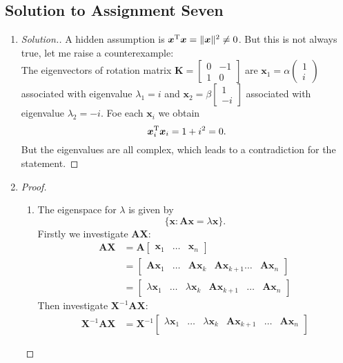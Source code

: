 \subsection{Solution to Assignment Seven}
\begin{enumerate}
\item
\begin{proof}[Solution.]
A hidden assumption is $\bm x^{\mathrm T}\bm x=\|\bm x\|^2\ne0$. But this is not always true, let me raise a counterexample:\\
The eigenvectors of rotation matrix $\bm K=\begin{bmatrix}
0&-1\\1&0
\end{bmatrix}$ are $\bm x_1=\alpha\begin{pmatrix}
1\\i
\end{pmatrix}$ associated with eigenvalue $\lambda_1=i$ and $\bm x_2=\beta\begin{bmatrix}
1\\-i
\end{bmatrix}$ associated with eigenvalue $\lambda_2=-i$. Foe each $\bm x_i$ we obtain
\[
\bm x_i^{\mathrm T}\bm x_i=1+i^2=0.
\]
But the eigenvalues are all complex, which leads to a contradiction for the statement.
\end{proof}
\item
\begin{proof}
\begin{enumerate}
\item
The eigenspace for $\lambda$ is given by
\[
\{\bm x:\bm A\bm x=\lambda\bm x\}.
\]
Firstly we investigate $\bm{AX}$:
\begin{align*}
\bm A\bm X&=\bm A\begin{bmatrix}
\bm x_1&\dots&\bm x_n
\end{bmatrix}\\
&=\begin{bmatrix}
\bm A\bm x_1&\dots&\bm A\bm x_k&\bm A\bm x_{k+1}\dots&\bm A\bm x_n
\end{bmatrix}\\
&=
\begin{bmatrix}
\lambda\bm x_1&\dots&\lambda\bm x_k&\bm A\bm x_{k+1}&\dots&\bm A\bm x_n
\end{bmatrix}
\end{align*}
Then investigate $\bm X^{-1}\bm A\bm X:$
\begin{align*}
\bm X^{-1}\bm A\bm X&=
\bm X^{-1}\begin{bmatrix}
\lambda\bm x_1&\dots&\lambda\bm x_k&\bm A\bm x_{k+1}&\dots&\bm A\bm x_n\\

\end{bmatrix}
\end{align*}
\end{enumerate}
\end{proof}
\end{enumerate}
